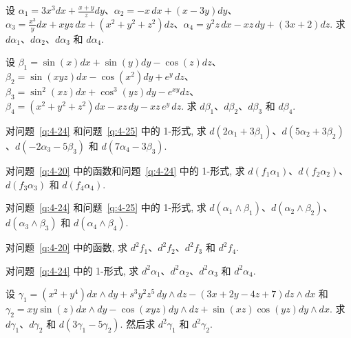 \begin{question}\label{q:4-24}
设 $\alpha_1=3x^3dx+\frac{x+y}{z}dy$、$\alpha_2=-x\,dx+(x-3y)dy$、$\alpha_3=\frac{x^3}{y}dx+xyz\,dx+(x^2+y^2+z^2)dz$、$\alpha_4=y^2z\,dx-xz\,dy+(3x+2)dz$. 求 $d\alpha_1$、$d\alpha_2$、$d\alpha_3$ 和 $d\alpha_4$.
\end{question}

\begin{question}\label{q:4-25}
设 $\beta_1=\sin(x)dx+\sin(y)dy-\cos(z)dz$、$\beta_2=\sin(xyz)dx-\cos(x^2)dy+e^y\,dz$、$\beta_3=\sin^2(xz)dx+\cos^3(yz)dy-e^{xy}dz$、$\beta_4=(x^2+y^2+z^2)dx-xz\,dy-xz\,e^y\,dz$. 求 $d\beta_1$、$d\beta_2$、$d\beta_3$ 和 $d\beta_4$.
\end{question}

\begin{question}\label{q:4-26}
对问题~\ref{q:4-24} 和问题~\ref{q:4-25} 中的 1-形式, 求 $d(2\alpha_1+3\beta_1)$、$d(5\alpha_2+3\beta_2)$、$d(-2\alpha_3-5\beta_3)$ 和 $d(7\alpha_4-3\beta_3)$.
\end{question}

\begin{question}\label{q:4-27}
对问题~\ref{q:4-20} 中的函数和问题~\ref{q:4-24} 中的 1-形式, 求 $d(f_1\alpha_1)$、$d(f_2\alpha_2)$、$d(f_3\alpha_3)$ 和 $d(f_4\alpha_4)$.
\end{question}

\begin{question}\label{q:4-28}
对问题~\ref{q:4-24} 和问题~\ref{q:4-25} 中的 1-形式, 求 $d(\alpha_1\wedge\beta_1)$、$d(\alpha_2\wedge\beta_2)$、$d(\alpha_3\wedge\beta_3)$ 和 $d(\alpha_4\wedge\beta_4)$.
\end{question}

\begin{question}\label{q:4-29}
对问题~\ref{q:4-20} 中的函数, 求 $d^2f_1$、$d^2f_2$、$d^2f_3$ 和 $d^2f_4$.
\end{question}

\begin{question}\label{q:4-30}
对问题~\ref{q:4-24} 中的 1-形式, 求 $d^2\alpha_1$、$d^2\alpha_2$、$d^2\alpha_3$ 和 $d^2\alpha_4$.
\end{question}

\begin{question}\label{q:4-31}
设 $\gamma_1=(x^2+y^4)dx\wedge dy+s^3y^2z^5\,dy\wedge dz-(3x+2y-4z+7)dz\wedge dx$ 和 $\gamma_2=xy\sin(z)dx\wedge dy-\cos(xyz)dy\wedge dz+\sin(xz)\cos(yz)dy\wedge dx$. 求 $d\gamma_1$、$d\gamma_2$ 和 $d(3\gamma_1-5\gamma_2)$. 然后求 $d^2\gamma_1$ 和 $d^2\gamma_2$.
\end{question}

